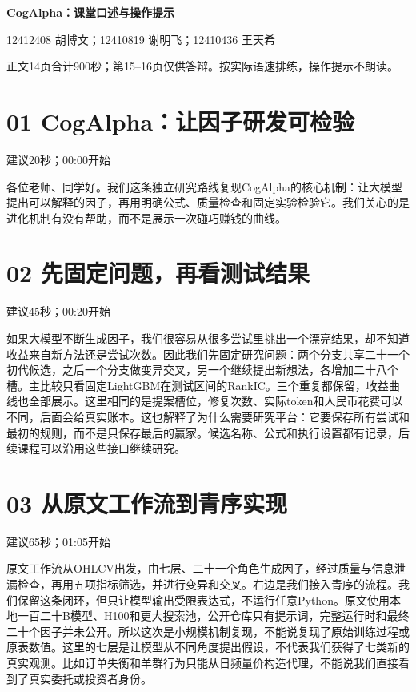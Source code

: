 \documentclass[UTF8,a4paper,11pt]{ctexart}
\begin{document}
{\Large\bfseries\color{ink}CogAlpha：课堂口述与操作提示}\par

12412408 胡博文；12410819 谢明飞；12410436 王天希\par
正文14页合计900秒；第15--16页仅供答辩。按实际语速排练，操作提示不朗读。
\section*{\color{ink}01 CogAlpha：让因子研发可检验}
{\small\color{accent}建议20秒；00:00开始}\par
各位老师、同学好。我们这条独立研究路线复现CogAlpha的核心机制：让大模型提出可以解释的因子，再用明确公式、质量检查和固定实验检验它。我们关心的是进化机制有没有帮助，而不是展示一次碰巧赚钱的曲线。
\section*{\color{ink}02 先固定问题，再看测试结果}
{\small\color{accent}建议45秒；00:20开始}\par
如果大模型不断生成因子，我们很容易从很多尝试里挑出一个漂亮结果，却不知道收益来自新方法还是尝试次数。因此我们先固定研究问题：两个分支共享二十一个初代候选，之后一个分支做变异交叉，另一个继续提出新想法，各增加二十八个槽。主比较只看固定LightGBM在测试区间的RankIC。三个重复都保留，收益曲线也全部展示。这里相同的是提案槽位，修复次数、实际token和人民币花费可以不同，后面会给真实账本。这也解释了为什么需要研究平台：它要保存所有尝试和最初的规则，而不是只保存最后的赢家。候选名称、公式和执行设置都有记录，后续课程可以沿用这些接口继续研究。
\newpage
\section*{\color{ink}03 从原文工作流到青序实现}
{\small\color{accent}建议65秒；01:05开始}\par
原文工作流从OHLCV出发，由七层、二十一个角色生成因子，经过质量与信息泄漏检查，再用五项指标筛选，并进行变异和交叉。右边是我们接入青序的流程。我们保留这条闭环，但只让模型输出受限表达式，不运行任意Python。原文使用本地一百二十B模型、H100和更大搜索池，公开仓库只有提示词，完整运行时和最终二十个因子并未公开。所以这次是小规模机制复现，不能说复现了原始训练过程或原表数值。这里的七层是让模型从不同角度提出假设，不代表我们获得了七类新的真实观测。比如订单失衡和羊群行为只能从日频量价构造代理，不能说我们直接看到了真实委托或投资者身份。
\end{document}
